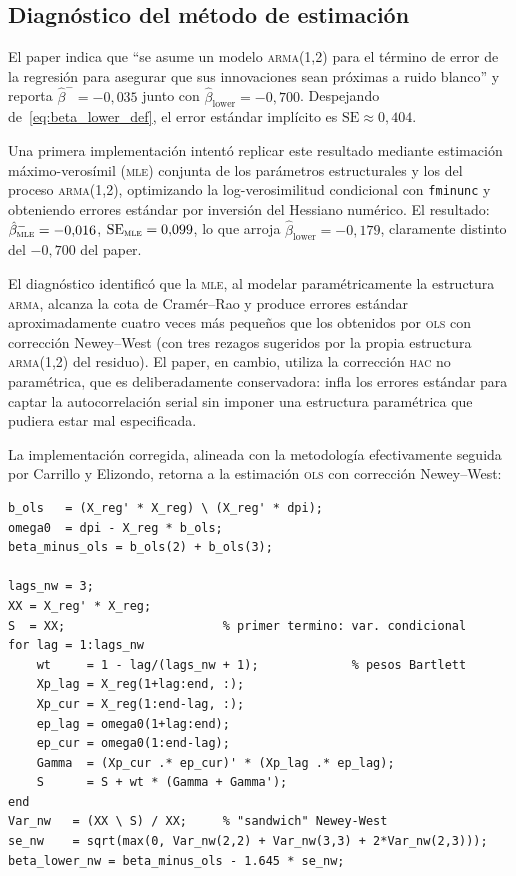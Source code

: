 \documentclass[11pt,letterpaper]{article}
\begin{document}
\subsection{Diagnóstico del método de estimación}

El paper indica que ``se asume un modelo \textsc{arma(1,2)} para el término de error de la regresión para asegurar que sus innovaciones sean próximas a ruido blanco'' y reporta $\hat\beta^- = -0{,}035$ junto con $\hat\beta_{\text{lower}} = -0{,}700$. Despejando de~\eqref{eq:beta_lower_def}, el error estándar implícito es $\mathrm{SE} \approx 0{,}404$.

Una primera implementación intentó replicar este resultado mediante estimación máximo-verosímil (\textsc{mle}) conjunta de los parámetros estructurales y los del proceso \textsc{arma(1,2)}, optimizando la log-verosimilitud condicional con \texttt{fminunc} y obteniendo errores estándar por inversión del Hessiano numérico. El resultado: $\hat\beta^-_{\textsc{mle}} = -0{,}016$, $\mathrm{SE}_{\textsc{mle}} = 0{,}099$, lo que arroja $\hat\beta_{\text{lower}} = -0{,}179$, claramente distinto del $-0{,}700$ del paper.

El diagnóstico identificó que la \textsc{mle}, al modelar paramétricamente la estructura \textsc{arma}, alcanza la cota de Cramér--Rao y produce errores estándar aproximadamente cuatro veces más pequeños que los obtenidos por \textsc{ols} con corrección Newey--West (con tres rezagos sugeridos por la propia estructura \textsc{arma(1,2)} del residuo). El paper, en cambio, utiliza la corrección \textsc{hac} no paramétrica, que es deliberadamente conservadora: infla los errores estándar para captar la autocorrelación serial sin imponer una estructura paramétrica que pudiera estar mal especificada.

La implementación corregida, alineada con la metodología efectivamente seguida por Carrillo y Elizondo, retorna a la estimación \textsc{ols} con corrección Newey--West:

\begin{lstlisting}[style=matlabstyle, caption={Estimación de $\hat\beta_{\text{lower}}$ por OLS+Newey-West}]
b_ols   = (X_reg' * X_reg) \ (X_reg' * dpi);
omega0  = dpi - X_reg * b_ols;
beta_minus_ols = b_ols(2) + b_ols(3);

lags_nw = 3;
XX = X_reg' * X_reg;
S  = XX;                      % primer termino: var. condicional
for lag = 1:lags_nw
    wt     = 1 - lag/(lags_nw + 1);             % pesos Bartlett
    Xp_lag = X_reg(1+lag:end, :);
    Xp_cur = X_reg(1:end-lag, :);
    ep_lag = omega0(1+lag:end);
    ep_cur = omega0(1:end-lag);
    Gamma  = (Xp_cur .* ep_cur)' * (Xp_lag .* ep_lag);
    S      = S + wt * (Gamma + Gamma');
end
Var_nw   = (XX \ S) / XX;     % "sandwich" Newey-West
se_nw    = sqrt(max(0, Var_nw(2,2) + Var_nw(3,3) + 2*Var_nw(2,3)));
beta_lower_nw = beta_minus_ols - 1.645 * se_nw;
\end{lstlisting}
\end{document}
